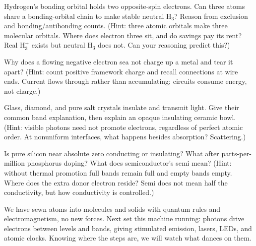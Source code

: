 \begin{puzzles}
\item Hydrogen's bonding orbital holds two opposite-spin electrons. Can three atoms share a bonding-orbital chain to make stable neutral H\(_3\)? Reason from exclusion and bonding/antibonding counts. (Hint: three atomic orbitals make three molecular orbitals. Where does electron three sit, and do savings pay its rent? Real H\(_3^+\) exists but neutral H\(_3\) does not. Can your reasoning predict this?)
\item Why does a flowing negative electron sea not charge up a metal and tear it apart? (Hint: count positive framework charge and recall connections at wire ends. Current flows through rather than accumulating; circuits consume energy, not charge.)
\item Glass, diamond, and pure salt crystals insulate and transmit light. Give their common band explanation, then explain an opaque insulating ceramic bowl. (Hint: visible photons need not promote electrons, regardless of perfect atomic order. At nonuniform interfaces, what happens besides absorption? Scattering.)
\item Is pure silicon near absolute zero conducting or insulating? What after parts-per-million phosphorus doping? What does semiconductor's semi mean? (Hint: without thermal promotion full bands remain full and empty bands empty. Where does the extra donor electron reside? Semi does not mean half the conductivity, but how conductivity is controlled.)
\end{puzzles}

We have sewn atoms into molecules and solids with quantum rules and electromagnetism, no new forces. Next set this machine running: photons drive electrons between levels and bands, giving stimulated emission, lasers, LEDs, and atomic clocks. Knowing where the steps are, we will watch what dances on them.
